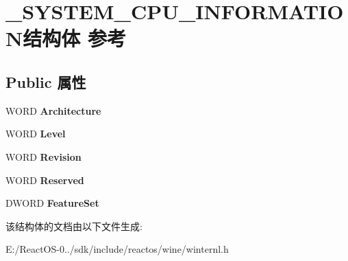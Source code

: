 \hypertarget{struct___s_y_s_t_e_m___c_p_u___i_n_f_o_r_m_a_t_i_o_n}{}\section{\+\_\+\+S\+Y\+S\+T\+E\+M\+\_\+\+C\+P\+U\+\_\+\+I\+N\+F\+O\+R\+M\+A\+T\+I\+O\+N结构体 参考}
\label{struct___s_y_s_t_e_m___c_p_u___i_n_f_o_r_m_a_t_i_o_n}
\subsection*{Public 属性}
\begin{DoxyCompactItemize}
\item 
\mbox{\label{struct___s_y_s_t_e_m___c_p_u___i_n_f_o_r_m_a_t_i_o_n_a1e5728eff9b8336d9217641a03fc2419}} 
W\+O\+RD {\bfseries Architecture}
\item 
\mbox{\label{struct___s_y_s_t_e_m___c_p_u___i_n_f_o_r_m_a_t_i_o_n_a575c9927b97eb82ec5cb255851441fcb}} 
W\+O\+RD {\bfseries Level}
\item 
\mbox{\label{struct___s_y_s_t_e_m___c_p_u___i_n_f_o_r_m_a_t_i_o_n_a5703884966a65a8ce834abedd2e466f0}} 
W\+O\+RD {\bfseries Revision}
\item 
\mbox{\label{struct___s_y_s_t_e_m___c_p_u___i_n_f_o_r_m_a_t_i_o_n_ab7e40e47548c944e1347831e9503ea35}} 
W\+O\+RD {\bfseries Reserved}
\item 
\mbox{\label{struct___s_y_s_t_e_m___c_p_u___i_n_f_o_r_m_a_t_i_o_n_a78074b04529a23e7c3ad2d46783b2f30}} 
D\+W\+O\+RD {\bfseries Feature\+Set}
\end{DoxyCompactItemize}


该结构体的文档由以下文件生成\+:\begin{DoxyCompactItemize}
\item 
E\+:/\+React\+O\+S-\/0../sdk/include/reactos/wine/winternl.\+h\end{DoxyCompactItemize}
